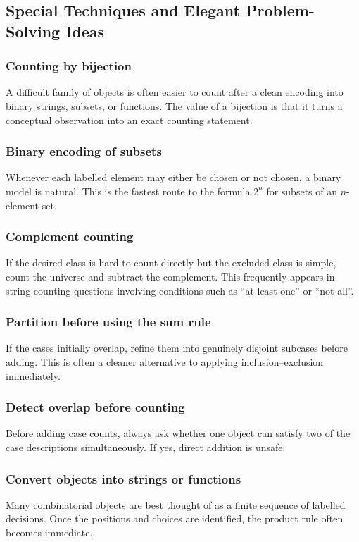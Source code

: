 \subsection{Special Techniques and Elegant Problem-Solving Ideas}

\subsubsection*{Counting by bijection}
A difficult family of objects is often easier to count after a clean encoding into binary strings, subsets, or functions. The value of a bijection is that it turns a conceptual observation into an exact counting statement.

\subsubsection*{Binary encoding of subsets}
Whenever each labelled element may either be chosen or not chosen, a binary model is natural. This is the fastest route to the formula $2^n$ for subsets of an $n$-element set.

\subsubsection*{Complement counting}
If the desired class is hard to count directly but the excluded class is simple, count the universe and subtract the complement. This frequently appears in string-counting questions involving conditions such as ``at least one'' or ``not all''.

\subsubsection*{Partition before using the sum rule}
If the cases initially overlap, refine them into genuinely disjoint subcases before adding. This is often a cleaner alternative to applying inclusion--exclusion immediately.

\subsubsection*{Detect overlap before counting}
Before adding case counts, always ask whether one object can satisfy two of the case descriptions simultaneously. If yes, direct addition is unsafe.

\subsubsection*{Convert objects into strings or functions}
Many combinatorial objects are best thought of as a finite sequence of labelled decisions. Once the positions and choices are identified, the product rule often becomes immediate.


